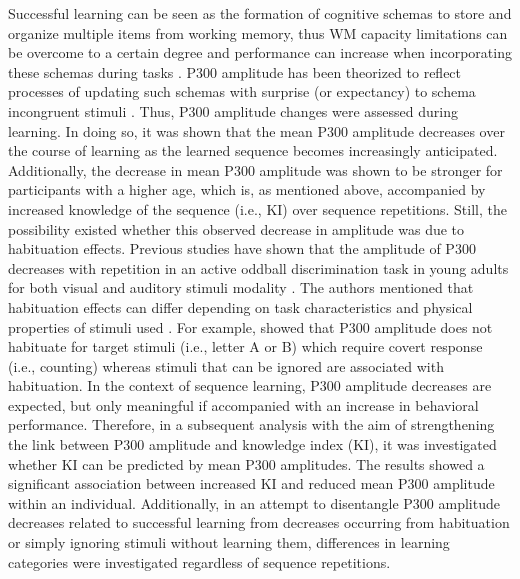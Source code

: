 Successful learning can be seen as the formation of cognitive schemas to store and organize multiple items from working memory, thus WM capacity limitations can be overcome to a certain degree and performance can increase when incorporating these schemas during tasks \parencite{bengsonEffectsStrategyVisual2016,cowanMagicalMysteryFour2010,paasCognitiveLoadTheory2014,vanmerrienboerCognitiveLoadTheory2010}. P300 amplitude has been theorized to reflect processes of updating such schemas with surprise (or expectancy) to schema incongruent stimuli \parencite{donchinSurpriseSurprise1981}. Thus, P300 amplitude changes were assessed during learning. In doing so, it was shown that the mean P300 amplitude decreases over the course of learning as the learned sequence becomes increasingly anticipated. Additionally, the decrease in mean P300 amplitude was shown to be stronger for participants with a higher age, which is, as mentioned above, accompanied by increased knowledge of the sequence (i.e., KI) over sequence repetitions. Still, the possibility existed whether this observed decrease in amplitude was due to habituation effects. Previous studies have shown that the amplitude of P300 decreases with repetition in an active oddball discrimination task in young adults for both visual and auditory stimuli modality \parencite{romeroP300Habituation1996}. The authors mentioned that habituation effects can differ depending on task characteristics and physical properties of stimuli used \parencite{romeroP300Habituation1996}. For example, \textcite{courchesneChangesP3Waves1978} showed that P300 amplitude does not habituate for target stimuli (i.e., letter A or B) which require covert response (i.e., counting) whereas stimuli that can be ignored are associated with habituation. In the context of sequence learning, P300 amplitude decreases are expected, but only meaningful if accompanied with an increase in behavioral performance. Therefore, in a subsequent analysis with the aim of strengthening the link between P300 amplitude and knowledge index (KI), it was investigated whether KI can be predicted by mean P300 amplitudes. The results showed a significant association between increased KI and reduced mean P300 amplitude within an individual. Additionally, in an attempt to disentangle P300 amplitude decreases related to successful learning from decreases occurring from habituation or simply ignoring stimuli without learning them, differences in learning categories were investigated regardless of sequence repetitions. 
